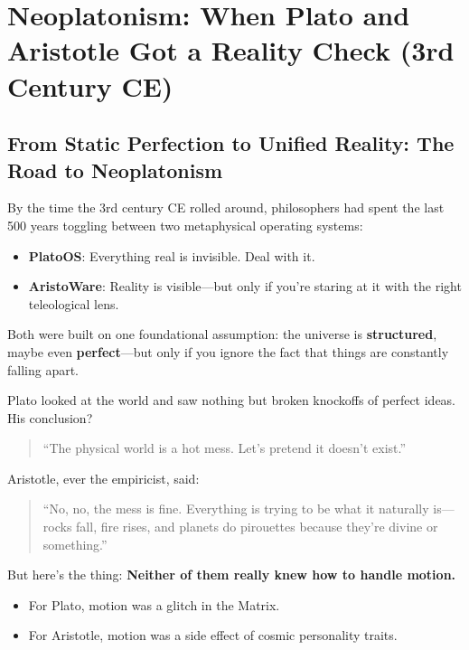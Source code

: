 \section{Neoplatonism: When Plato and Aristotle Got a Reality Check (3rd Century CE)}

\subsection{From Static Perfection to Unified Reality: The Road to Neoplatonism}

By the time the 3rd century CE rolled around, philosophers had spent the last 500 years toggling between two metaphysical operating systems:

\begin{itemize}
    \item \textbf{PlatoOS}: Everything real is invisible. Deal with it.
    \item \textbf{AristoWare}: Reality is visible—but only if you're staring at it with the right teleological lens.
\end{itemize}

Both were built on one foundational assumption: the universe is \textbf{structured}, maybe even \textbf{perfect}—but only if you ignore the fact that things are constantly falling apart.

Plato looked at the world and saw nothing but broken knockoffs of perfect ideas. His conclusion?

\begin{quote}
    “The physical world is a hot mess. Let’s pretend it doesn’t exist.”
\end{quote}

Aristotle, ever the empiricist, said:

\begin{quote}
    “No, no, the mess is fine. Everything is trying to be what it naturally is—rocks fall, fire rises, and planets do pirouettes because they’re divine or something.”
\end{quote}

But here's the thing: \textbf{Neither of them really knew how to handle motion.}

\begin{itemize}
    \item For Plato, motion was a glitch in the Matrix.
    \item For Aristotle, motion was a side effect of cosmic personality traits.
\end{itemize}

